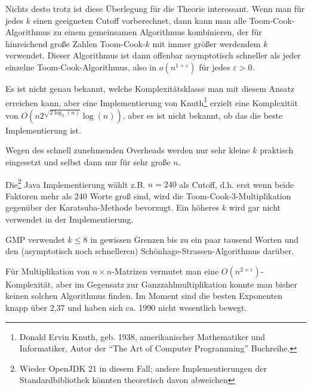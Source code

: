 \begin{remark}
    Nichts desto trotz ist diese Überlegung für die Theorie interessant. Wenn man für jedes $k$ einen geeigneten Cutoff vorberechnet, dann kann man alle Toom-Cook-Algorithmus zu einem gemeinsamen Algorithmus kombinieren, der für hinreichend große Zahlen Toom-Cook-$k$ mit immer größer werdendem $k$ verwendet. Dieser Algorithmus ist dann offenbar asymptotisch schneller als jeder einzelne Toom-Cook-Algorithmus, also in $o(n^{1+\varepsilon})$ für jedes $\varepsilon>0$.

    \smallskip
    Es ist nicht genau bekannt, welche Komplexitätsklasse man mit diesem Ansatz erreichen kann, aber eine Implementierung von Knuth\footnote{Donald Ervin Knuth, geb. 1938, amerikanischer Mathematiker und Informatiker, Autor der \enquote{The Art of Computer Programming} Buchreihe.} erzielt eine Komplexität von $O(n 2^{\sqrt{2 \log_2(n)}} \log(n))$, aber es ist nicht bekannt, ob das die beste Implementierung ist.
\end{remark}

\begin{remark}
    Wegen des schnell zunehmenden Overheads werden nur sehr kleine $k$ praktisch eingesetzt und selbst dann nur für sehr große $n$.

    \smallskip
    Die\footnote{Wieder OpenJDK 21 in diesem Fall; andere Implementierungen der Standardbibliothek könnten theoretisch davon abweichen} Java Implementierung wählt z.B. $n=240$ als Cutoff, d.h. erst wenn beide Faktoren mehr als 240 Worte groß sind, wird die Toom-Cook-$3$-Multiplikation gegenüber der Karatsuba-Methode bevorzugt. Ein höheres $k$ wird gar nicht verwendet in der Implementierung.

    \smallskip
    GMP verwendet $k\leq 8$ in gewissen Grenzen bis zu ein paar tausend Worten und den (asymptotisch noch schnelleren) Schönhage-Strassen-Algorithmus darüber.
\end{remark}

\begin{remark}
    Für Multiplikation von $n\times n$-Matrizen vermutet man eine $O(n^{2+\varepsilon})$-Komplexität, aber im Gegensatz zur Ganzzahlmultiplikation konnte man bisher keinen solchen Algorithmus finden. Im Moment sind die besten Exponenten knapp über 2,37 und haben sich ca. 1990 nicht wesentlich bewegt.
\end{remark}